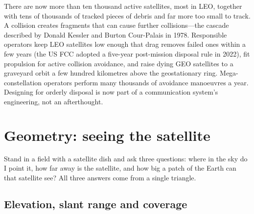 \begin{pitfall}
There are now more than ten thousand active satellites, most in LEO, together with tens of
thousands of tracked pieces of debris and far more too small to track. A collision creates
fragments that can cause further collisions---the cascade described by Donald Kessler and
Burton Cour-Palais in 1978. Responsible operators keep LEO satellites low enough that drag
removes failed ones within a few years (the US FCC adopted a five-year post-mission disposal
rule in 2022), fit propulsion for active collision avoidance, and raise dying GEO satellites to
a graveyard orbit a few hundred kilometres above the geostationary ring. Mega-constellation
operators perform many thousands of avoidance manoeuvres a year. Designing for orderly disposal
is now part of a communication system's engineering, not an afterthought.
\end{pitfall}

\section{Geometry: seeing the satellite}
\label{sec:ch23:geometry}

Stand in a field with a satellite dish and ask three questions: where in the sky do I point it,
how far away is the satellite, and how big a patch of the Earth can that satellite see? All three
answers come from a single triangle.

\subsection{Elevation, slant range and coverage}

